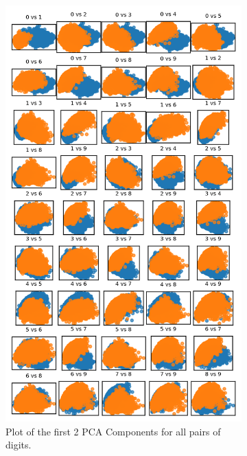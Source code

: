 \documentclass{article}
\begin{document}
\begin{figure}[h!]
    \centering
    \begin{subfigure}[t]{0.45\textwidth}
        \centering
        \includegraphics[width=\textwidth]{./plots/plot2.png}
        \caption{Plot of the first 2 PCA Components for all pairs of digits.}
        \label{fig:plot2a}
    \end{subfigure}
    \hspace{0.02\textwidth}
    \begin{subfigure}[t]{0.45\textwidth}

\end{subfigure}
\end{figure}
\end{document}
